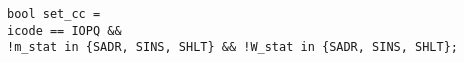 \documentclass{article}
\begin{document}
\texttt{bool set\_cc = \\
\hspace*{17mm} icode == IOPQ \&\& \\
\hspace*{17mm} !m\_stat in \{SADR, SINS, SHLT\} \&\& !W\_stat in \{SADR, SINS, SHLT\};
}
\end{document}
